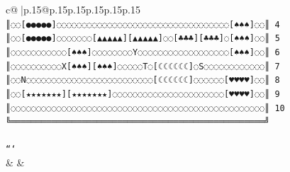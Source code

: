 \documentclass{article}
\begin{document}
{\begin{supertabular}{c@{$\;$}|p{.15\linewidth}@{}p{.15\linewidth}p{.15\linewidth}p{.15\linewidth}p{.15\linewidth}p{.15\linewidth}}
{{{\texttt{║◌◌{[}●●●●●{]}◌◌◌◌◌◌◌◌◌◌◌◌◌◌◌◌◌◌◌◌◌◌◌◌◌◌◌◌◌◌◌◌◌◌{[}♠♠♠{]}◌◌║ 4} \\
\texttt{║◌◌{[}●●●●●{]}◌◌◌◌◌◌◌{[}▲▲▲▲▲{]}{[}▲▲▲▲▲{]}◌◌{[}♣♣♣{]}{[}♣♣♣{]}◌{[}♠♠♠{]}◌◌║ 5} \\
\texttt{║◌◌◌◌◌◌◌◌◌◌◌{[}♠♠♠{]}◌◌◌◌◌◌◌◌Y◌◌◌◌◌◌◌◌◌◌◌◌◌◌◌◌◌◌{[}♠♠♠{]}◌◌║ 6} \\
\texttt{║◌◌◌◌◌◌◌◌◌◌X{[}♠♠♠{]}{[}♠♠♠{]}◌◌◌◌◌T◌{[}☾☾☾☾☾☾{]}◌S◌◌◌◌◌◌◌◌◌◌◌◌║ 7} \\
\texttt{║◌◌N◌◌◌◌◌◌◌◌◌◌◌◌◌◌◌◌◌◌◌◌◌◌◌◌◌{[}☾☾☾☾☾☾{]}◌◌◌◌◌◌{[}♥♥♥♥{]}◌◌║ 8} \\
\texttt{║◌◌{[}★★★★★★★{]}{[}★★★★★★★{]}◌◌◌◌◌◌◌◌◌◌◌◌◌◌◌◌◌◌◌◌◌◌{[}♥♥♥♥{]}◌◌║ 9} \\
\texttt{║◌◌◌◌◌◌◌◌◌◌◌◌◌◌◌◌◌◌◌◌◌◌◌◌◌◌◌◌◌◌◌◌◌◌◌◌◌◌◌◌◌◌◌◌◌◌◌◌◌◌║ 10} \\
\texttt{╚══════════════════════════════════════════════════╝} \\
\\ 
\texttt{```} \\
            }
        }
    }
    & & \\ \\


\end{supertabular}}
\end{document}
